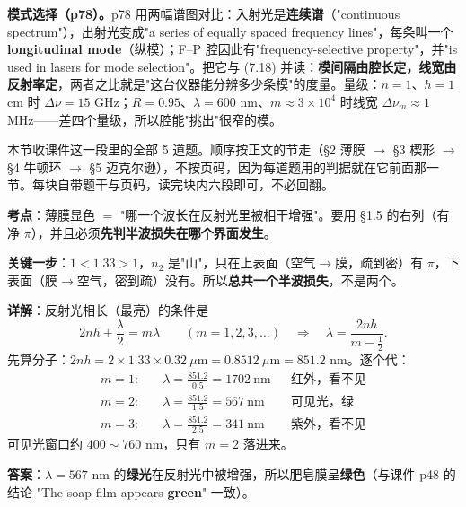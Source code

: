 \documentclass[10pt]{ctexart}
\renewcommand{\qbreak}{\needspace{0.50\textheight}}
\begin{document}
\textbf{模式选择（p78）。}p78 用两幅谱图对比：入射光是\textbf{连续谱}（"continuous spectrum"），出射光变成"a series of equally spaced frequency lines"，每条叫一个 \textbf{longitudinal mode}（纵模）；F--P 腔因此有"frequency-selective property"，并"is used in lasers for mode selection"。把它与 (7.18) 并读：\textbf{模间隔由腔长定，线宽由反射率定}，两者之比就是"这台仪器能分辨多少条模"的度量。量级：$n=1$、$h=1$ cm 时 $\Delta\nu=15$ GHz；$R=0.95$、$\lambda=600$ nm、$m\approx3\times10^4$ 时线宽 $\Delta\nu_m\approx1$ MHz——差四个量级，所以腔能"挑出"很窄的模。

\flowerrule



本节收课件这一段里的全部 5 道题。顺序按正文的节走（\S2 薄膜 $\to$ \S3 楔形 $\to$ \S4 牛顿环 $\to$ \S5 迈克尔逊），不按页码，因为每道题用的判据就在它前面那一节。每块自带题干与页码，读完块内六段即可，不必回翻。


\qbreak
{}

\textbf{考点}：薄膜显色 $=$ "哪一个波长在反射光里被相干增强"。要用 \S1.5 的右列（有净 $\pi$），并且必须\textbf{先判半波损失在哪个界面发生}。

\textbf{关键一步}：$1<1.33>1$，$n_2$ 是"山"，只在上表面（空气$\to$膜，疏到密）有 $\pi$，下表面（膜$\to$空气，密到疏）没有。所以\textbf{总共一个半波损失}，不是两个。

\textbf{详解}：反射光相长（最亮）的条件是
\[
2nh+\frac{\lambda}{2}=m\lambda\qquad(m=1,2,3,\dots)
\quad\Longrightarrow\quad
\lambda=\frac{2nh}{m-\frac12}. \tag{8.1}
\]
先算分子：$2nh=2\times1.33\times0.32\ \mu\mathrm{m}=0.8512\ \mu\mathrm{m}=851.2$ nm。逐个代：
\[
\begin{aligned}
m=1:\quad&\lambda=\frac{851.2}{0.5}=1702\ \mathrm{nm} &&\text{红外，看不见}\\
m=2:\quad&\lambda=\frac{851.2}{1.5}=567\ \mathrm{nm} &&\text{可见光，绿}\\
m=3:\quad&\lambda=\frac{851.2}{2.5}=341\ \mathrm{nm} &&\text{紫外，看不见}
\end{aligned}
\]
可见光窗口约 $400\sim760$ nm，只有 $m=2$ 落进来。

\textbf{答案}：$\lambda=567$ nm 的\textbf{绿光}在反射光中被增强，所以肥皂膜呈\textbf{绿色}（与课件 p48 的结论 "The soap film appears \textbf{green}" 一致）。
\end{document}
